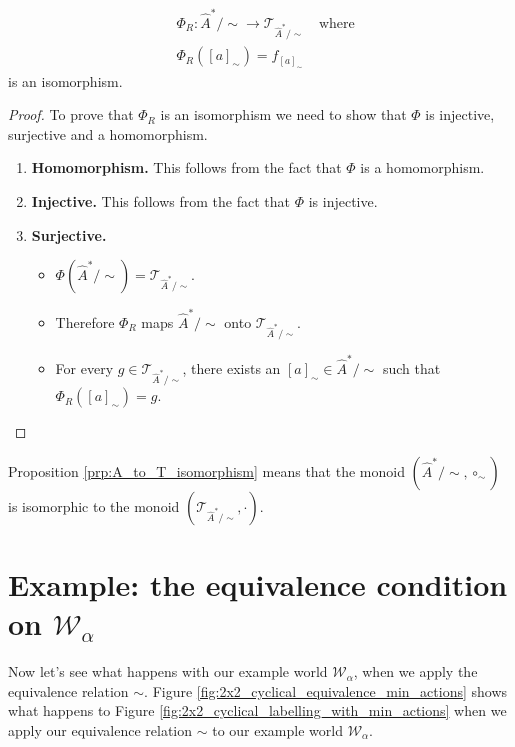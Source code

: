 \begin{proposition}\label{prp:A_to_T_isomorphism}
	\begin{equation}
		\begin{aligned}
			 & \Phi_{R} : \hat{A}^{\ast}/\sim \to \mathcal{T}_{\hat{A}^{\ast}/\sim} \quad \text{where} \\
			 & \Phi_{R}([a]_{\sim}) = f_{[a]_{\sim}}
		\end{aligned}
	\end{equation}
	is an isomorphism.
\end{proposition}
\begin{proof}
	To prove that $\Phi_{R}$ is an isomorphism we need to show that $\Phi$ is injective, surjective and a homomorphism.
	\begin{enumerate}[(1)]
		\item \textbf{Homomorphism.}
		      This follows from the fact that $\Phi$ is a homomorphism.

		\item \textbf{Injective.}
		      This follows from the fact that $\Phi$ is injective.

		\item \textbf{Surjective.}
		      \begin{itemize}
			      \item $\Phi(\hat{A}^{\ast}/\sim) = \mathcal{T}_{\hat{A}^{\ast}/\sim}$.
			      \item Therefore $\Phi_{R}$ maps $\hat{A}^{\ast}/\sim$ onto $\mathcal{T}_{\hat{A}^{\ast}/\sim}$.
			      \item For every $g \in \mathcal{T}_{\hat{A}^{\ast}/\sim}$, there exists an $[a]_{\sim} \in \hat{A}^{\ast}/\sim$ such that $\Phi_{R}([a]_{\sim}) = g$.
		      \end{itemize}
	\end{enumerate}
\end{proof}

Proposition \ref{prp:A_to_T_isomorphism} means that the monoid $(\hat{A}^{\ast}/\sim, \circ_{\sim})$ is isomorphic to the monoid $(\mathcal{T}_{\hat{A}^{\ast}/\sim}, \cdot)$.


\section{
Example: the equivalence condition on \texorpdfstring{$\mathscr{W}_{\alpha}$}{example world}
}\label{sec:the_equivalence_condition_on_example_world}

Now let's see what happens with our example world $\mathscr{W}_{\alpha}$, when we apply the equivalence relation $\sim$.
Figure \ref{fig:2x2_cyclical_equivalence_min_actions} shows what happens to Figure \ref{fig:2x2_cyclical_labelling_with_min_actions} when we apply our equivalence relation $\sim$ to our example world $\mathscr{W}_{\alpha}$.

